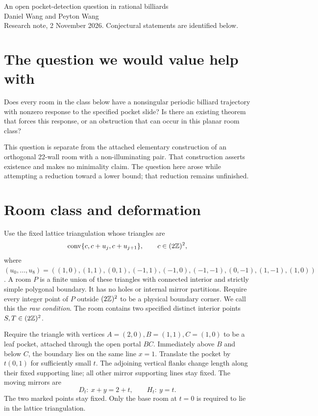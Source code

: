 \documentclass[11pt]{article}
\begin{document}
\begin{center}
{\Large An open pocket-detection question in rational billiards}\\[4pt]
Daniel Wang and Peyton Wang\\
\small Research note, 2 November 2026. Conjectural statements are identified below.
\end{center}

\section*{The question we would value help with}
Does every room in the class below have a nonsingular periodic billiard trajectory with nonzero response to the specified pocket slide? Is there an existing theorem that forces this response, or an obstruction that can occur in this planar room class?

This question is separate from the attached elementary construction of an orthogonal 22-wall room with a non-illuminating pair. That construction asserts existence and makes no minimality claim. The question here arose while attempting a reduction toward a lower bound; that reduction remains unfinished.

\section*{Room class and deformation}
Use the fixed lattice triangulation whose triangles are
\[
\operatorname{conv}\{c,c+u_j,c+u_{j+1}\},\qquad c\in(2\mathbb Z)^2,
\]
where $(u_0,\ldots,u_8)=((1,0),(1,1),(0,1),(-1,1),(-1,0),
(-1,-1),(0,-1),(1,-1),(1,0))$.
A room $P$ is a finite union of these triangles with connected interior and strictly simple polygonal boundary. It has no holes or internal mirror partitions. Require every integer point of $P$ outside $(2\mathbb Z)^2$ to be a physical boundary corner. We call this the \emph{raw condition}. The room contains two specified distinct interior points $S,T\in(2\mathbb Z)^2$.

Require the triangle with vertices $A=(2,0), B=(1,1), C=(1,0)$ to be a leaf pocket, attached through the open portal $BC$. Immediately above $B$ and below $C$, the boundary lies on the same line $x=1$. Translate the pocket by $t(0,1)$ for sufficiently small $t$. The adjoining vertical flanks change length along their fixed supporting line; all other mirror supporting lines stay fixed. The moving mirrors are
\[
 D_t:\ x+y=2+t,\qquad H_t:\ y=t.
\]
The two marked points stay fixed. Only the base room at $t=0$ is required to lie in the lattice triangulation.
\end{document}
